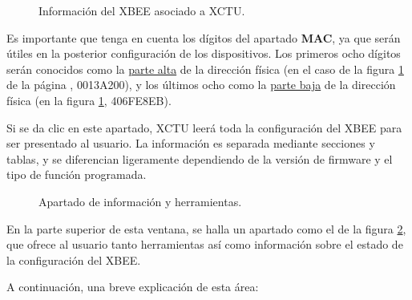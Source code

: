 \begin{figure}[H] %
\caption[1]{Información del XBEE asociado a XCTU.}
\label{fig:RtrInf}
\end{figure}

Es importante que tenga en cuenta los dígitos del apartado \textbf{MAC}, ya que serán útiles en la posterior configuración de los dispositivos. Los primeros ocho dígitos serán conocidos como la \underline{parte alta} de la dirección física (en el caso de la figura \ref{fig:RtrInf} de la página \pageref{fig:RtrInf}, 0013A200), y los últimos ocho como la \underline{parte baja} de la dirección física (en la figura \ref{fig:RtrInf}, 406FE8EB).

Si se da clic en este apartado, XCTU leerá toda la configuración del XBEE para ser presentado al usuario. La información es separada mediante secciones y tablas, y se diferencian ligeramente dependiendo de la versión de firmware y el tipo de función programada. 

\begin{figure}[H] %
\caption[1]{Apartado de información y herramientas.}
\label{fig:TMain}
\end{figure}

En la parte superior de esta ventana, se halla un apartado como el de la figura \ref{fig:TMain}, que ofrece al usuario tanto herramientas así como información sobre el estado de la configuración del XBEE.

A continuación, una breve explicación de esta área:

